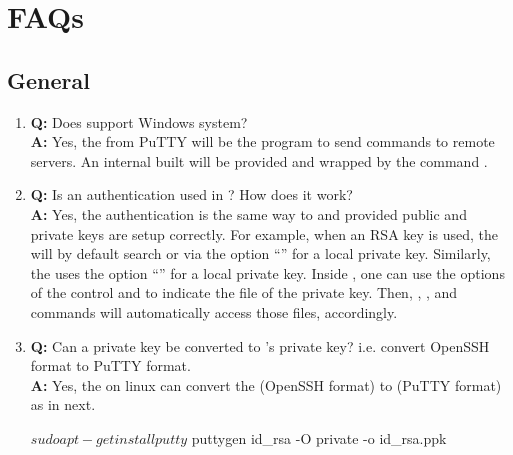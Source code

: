 

\section[FAQs]{FAQs}
\label{sec:faqs}


\subsection[General]{General}
\label{sec:general}

\begin{enumerate}
\item {\bf\color{blue} Q:}
      Does  support Windows system? \\
      {\bf\color{blue} A:}
      Yes, the  from PuTTY will be the program to send
      commands to remote servers. An internal built  will
      be provided and wrapped by the  command .

\item {\bf\color{blue} Q:}
      Is an authentication used in ? How does it work? \\
      {\bf\color{blue} A:}
      Yes, the authentication is the same way to  and
       provided public and private keys are setup correctly.
      For example, when an RSA key is used, the  will by
      default search
       or via the option ``'' for a local
      private key.
      Similarly,
      the  uses the option ``'' for a
      local private key.
      Inside , one can use the options of the control
       and  to
      indicate the file of the private key. Then, , ,
      and  commands will automatically access those files,
      accordingly.

\item {\bf\color{blue} Q:}
      Can a  private key be converted to 's private
      key? i.e. convert OpenSSH format to PuTTY format. \\
      {\bf\color{blue} A:}
      Yes, the  on linux can convert the 
      (OpenSSH format) to  (PuTTY format) as in next.
\begin{Command}
$ sudo apt-get install putty
$ puttygen id_rsa -O private -o id_rsa.ppk
\end{Command}


\end{enumerate}
